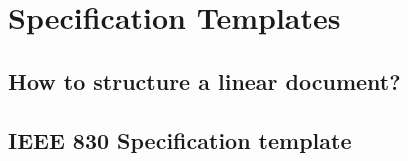 \documentclass{reqengbook}
\begin{document}
\begin{adjustbox}{width=2.0\textwidth}

\end{adjustbox} 

\chapter{Specification Templates}

\section{How to structure a linear document?}

\section{IEEE 830 Specification template}
\end{document}
